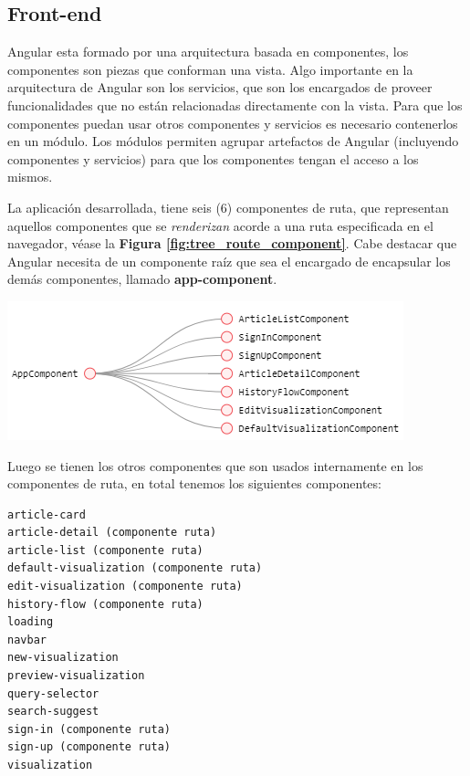 \subsection{Front-end}
Angular esta formado por una arquitectura basada en componentes, los componentes son piezas que conforman una vista. Algo importante en la arquitectura de Angular son los servicios, que son los encargados de proveer funcionalidades que no están relacionadas directamente con la vista. Para que los componentes puedan usar otros componentes y servicios es necesario contenerlos en un módulo. Los módulos permiten agrupar artefactos de Angular (incluyendo componentes y servicios) para que los componentes tengan el acceso a los mismos.

La aplicación desarrollada, tiene seis (6) componentes de ruta, que representan aquellos componentes que se \textit{renderizan} acorde a una ruta especificada en el navegador, véase la \textbf{Figura \ref{fig:tree_route_component}}. Cabe destacar que Angular necesita de un componente raíz que sea el encargado de encapsular los demás componentes, llamado \textbf{app-component}.


\begin{center}
    \bigbreak
    \includegraphics[scale=0.9]{images/marco_aplicativo/tree_route_component.png}
    \label{fig:tree_route_component}
    \bigbreak
\end{center}

Luego se tienen los otros componentes que son usados internamente en los componentes de ruta, en total tenemos los siguientes componentes:
\begin{verbatim}
article-card
article-detail (componente ruta)
article-list (componente ruta)
default-visualization (componente ruta)
edit-visualization (componente ruta)
history-flow (componente ruta)
loading
navbar
new-visualization
preview-visualization
query-selector
search-suggest
sign-in (componente ruta)
sign-up (componente ruta)
visualization

\end{verbatim}

